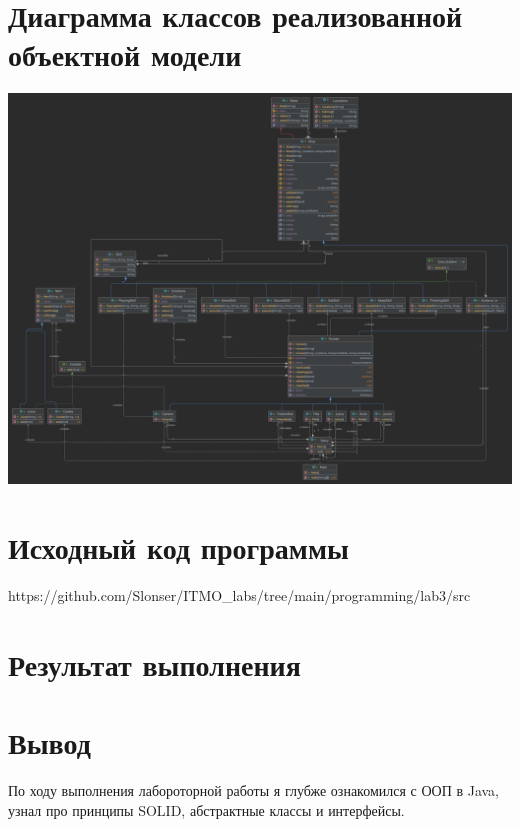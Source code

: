 \documentclass[12pt,onecolumn]{article}
\begin{document}
\section{Диаграмма классов реализованной объектной модели}
\includegraphics[width=\columnwidth]{diagram.png}
\newpage
\section{Исходный код программы}
https://github.com/Slonser/ITMO\_labs/tree/main/programming/lab3/src
\newpage
\section{Результат выполнения}

\newpage
\section{Вывод}
По ходу выполнения лабороторной работы я глубже ознакомился с ООП в Java, узнал про принципы SOLID, абстрактные классы и интерфейсы.
\end{document}
